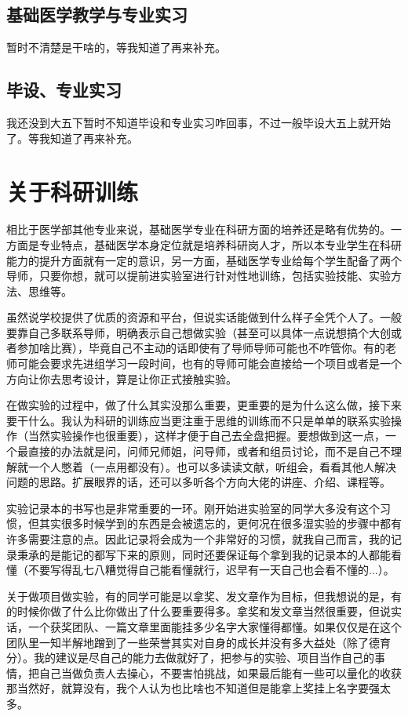 \documentclass[zihao=-4,fontset=none]{Beautybook-CN}
\begin{document}
\subsection{基础医学教学与专业实习}

暂时不清楚是干啥的，等我知道了再来补充。

\subsection{毕设、专业实习}

我还没到大五下暂时不知道毕设和专业实习咋回事，不过一般毕设大五上就开始了。等我知道了再来补充。

\section{关于科研训练}\label{basexp}

相比于医学部其他专业来说，基础医学专业在科研方面的培养还是略有优势的。一方面是专业特点，基础医学本身定位就是培养科研岗人才，所以本专业学生在科研能力的提升方面就有一定的意识，另一方面，基础医学专业给每个学生配备了两个导师，只要你想，就可以提前进实验室进行针对性地训练，包括实验技能、实验方法、思维等。

虽然说学校提供了优质的资源和平台，但说实话能做到什么样子全凭个人了。一般要靠自己多联系导师，明确表示自己想做实验（甚至可以具体一点说想搞个大创或者参加啥比赛），毕竟自己不主动的话即使有了导师导师可能也不咋管你。有的老师可能会要求先进组学习一段时间，也有的导师可能会直接给一个项目或者是一个方向让你去思考设计，算是让你正式接触实验。

在做实验的过程中，做了什么其实没那么重要，更重要的是为什么这么做，接下来要干什么。我认为科研的训练应当更注重于思维的训练而不只是单单的联系实验操作（当然实验操作也很重要），这样才便于自己去全盘把握。要想做到这一点，一个最直接的办法就是问，问师兄师姐，问导师，或者和组员讨论，而不是自己不理解就一个人憋着（一点用都没有）。也可以多读读文献，听组会，看看其他人解决问题的思路。扩展眼界的话，还可以多听各个方向大佬的讲座、介绍、课程等。

实验记录本的书写也是非常重要的一环。刚开始进实验室的同学大多没有这个习惯，但其实很多时候学到的东西是会被遗忘的，更何况在很多湿实验的步骤中都有许多需要注意的点。因此记录将会成为一个非常好的习惯，就我自己而言，我的记录秉承的是能记的都写下来的原则，同时还要保证每个拿到我的记录本的人都能看懂（不要写得乱七八糟觉得自己能看懂就行，迟早有一天自己也会看不懂的...）。

关于做项目做实验，有的同学可能是以拿奖、发文章作为目标，但我想说的是，有的时候你做了什么比你做出了什么要重要得多。拿奖和发文章当然很重要，但说实话，一个获奖团队、一篇文章里面能挂多少名字大家懂得都懂。如果仅仅是在这个团队里一知半解地蹭到了一些荣誉其实对自身的成长并没有多大益处（除了德育分）。我的建议是尽自己的能力去做就好了，把参与的实验、项目当作自己的事情，把自己当做负责人去操心，不要害怕挑战，如果最后能有一些可以量化的收获那当然好，就算没有，我个人认为也比啥也不知道但是能拿上奖挂上名字要强太多。
\end{document}
